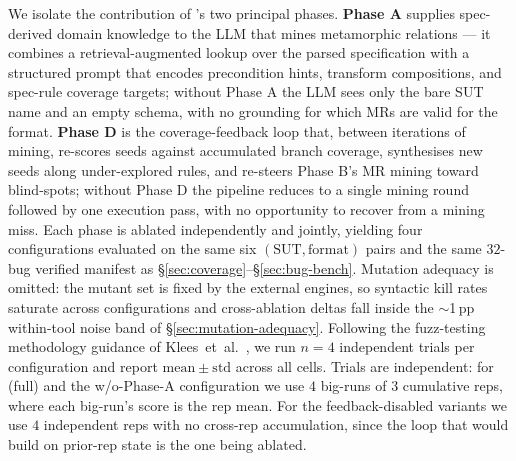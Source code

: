 We isolate the contribution of \biotest{}'s two principal
phases. \textbf{Phase A} supplies spec-derived domain
knowledge to the LLM that mines metamorphic relations --- it
combines a retrieval-augmented lookup over the parsed
specification with a structured prompt that encodes
precondition hints, transform compositions, and spec-rule
coverage targets; without Phase A the LLM sees only the bare
SUT name and an empty schema, with no grounding for which MRs
are valid for the format. \textbf{Phase D} is the
coverage-feedback loop that, between iterations of mining,
re-scores seeds against accumulated branch coverage,
synthesises new seeds along under-explored rules, and
re-steers Phase B's MR mining toward blind-spots; without
Phase D the pipeline reduces to a single mining round followed
by one execution pass, with no opportunity to recover from a
mining miss. Each phase is ablated independently and jointly,
yielding four configurations evaluated on the same six
$(\mathrm{SUT}, \mathrm{format})$ pairs and the same $32$-bug
verified manifest as
\S\ref{sec:coverage}--\S\ref{sec:bug-bench}. Mutation adequacy is omitted: the
mutant set is fixed by the external engines, so
syntactic kill rates saturate across configurations and
cross-ablation deltas fall inside the $\sim$1\,pp
within-tool noise band of \S\ref{sec:mutation-adequacy}. Following the
fuzz-testing methodology guidance of
Klees~et~al.~\citep{klees2018fuzz}, we run $n=4$ independent
trials per configuration and report
$\mathrm{mean} \pm \mathrm{std}$ across all cells. Trials are independent: for
\biotest{} (full) and the w/o-Phase-A configuration we use $4$ big-runs of $3$
cumulative reps, where each big-run's score is the rep mean.
For the feedback-disabled variants we use $4$ independent reps
with no cross-rep accumulation, since the loop that would build
on prior-rep state is the one being ablated.

